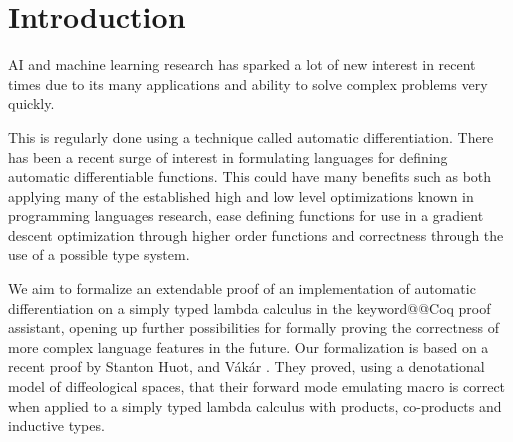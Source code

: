 \documentclass[12pt, final]{article}
\makeatletter
\def\Vakar{V\'{a}k\'{a}r}
\def\<#1>{\csname keyword@@#1\endcsname}
\makeatother
\begin{document}
\newpage

\setcounter{page}{2}
\tableofcontents
\newpage

\section{Introduction}

AI and machine learning research has sparked a lot of new interest in recent times due to its many applications and ability to solve complex problems very quickly.

This is regularly done using a technique called automatic differentiation.
There has been a recent surge of interest in formulating languages for defining automatic differentiable functions.
This could have many benefits such as both applying many of the established high and low level optimizations known in programming languages research, ease defining functions for use in a gradient descent optimization through higher order functions and correctness through the use of a possible type system.

We aim to formalize an extendable proof of an implementation of automatic differentiation on a simply typed lambda calculus in the \<Coq> proof assistant, opening up further possibilities for formally proving the correctness of more complex language features in the future.
Our formalization is based on a recent proof by Stanton Huot, and \Vakar{} \cite{huot2020correctness}.
They proved, using a denotational model of diffeological spaces, that their forward mode emulating macro is correct when applied to a simply typed lambda calculus with products, co-products and inductive types.

\end{document}
